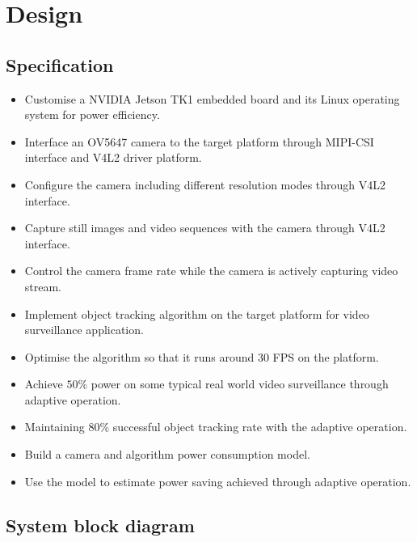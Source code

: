 \chapter{Design} \label{Chapter:Design}

\section{Specification}


\begin{itemize}
	\setlength\itemsep{0em}
	\item Customise a NVIDIA Jetson TK1 embedded board and its Linux operating system for power efficiency.
	\item Interface an OV5647 camera to the target platform through MIPI-CSI interface and V4L2 driver platform.
	\item Configure the camera including different resolution modes through V4L2 interface.
	\item Capture still images and video sequences with the camera through V4L2 interface.
	\item Control the camera frame rate while the camera is actively capturing video stream.
	\item Implement object tracking algorithm on the target platform for video surveillance application.
	\item Optimise the algorithm so that it runs around $30$ FPS on the platform.
	\item Achieve $50\%$ power  on some typical real world video surveillance  through adaptive operation.
	\item Maintaining $80\%$ successful object tracking rate with the adaptive operation.
	\item Build a camera and algorithm power consumption model.
	\item Use the model to estimate power saving achieved through adaptive operation.
\end{itemize}

\section{System block diagram}

